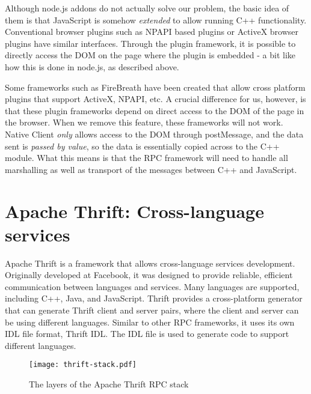 Although node.js addons do not actually solve our problem, the basic idea of them is that JavaScript is somehow \emph{extended} to allow running C++ functionality. Conventional browser plugins such as NPAPI based plugins or ActiveX browser plugins have similar interfaces. Through the plugin framework, it is possible to directly access the DOM on the page where the plugin is embedded - a bit like how this is done in node.js, as described above. 

Some frameworks such as FireBreath\cite{firebreath} have been created that allow cross platform plugins that support ActiveX, NPAPI, etc. A crucial difference for us, however, is that these plugin frameworks depend on direct access to the DOM of the page in the browser. When we remove this feature, these frameworks will not work. Native Client \emph{only} allows access to the DOM through postMessage, and the data sent is \emph{passed by value}, so the data is essentially copied across to the C++ module. What this means is that the RPC framework will need to handle all marshalling as well as transport of the messages between C++ and JavaScript.




\section{Apache Thrift: Cross-language services} %
\label{sec:apache_thrift_cross_language_services}
Apache Thrift is a framework that allows cross-language services development. Originally developed at Facebook, it was designed to provide reliable, efficient communication between languages and services. Many languages are supported, including C++, Java, and JavaScript. Thrift provides a cross-platform generator that can generate Thrift client and server pairs, where the client and server can be using different languages. Similar to other RPC frameworks, it uses its own IDL file format, Thrift IDL. The IDL file is used to generate code to support different languages.

\begin{figure}
    \centering
    \texttt{[image: thrift-stack.pdf]} 
    \caption{The layers of the Apache Thrift RPC stack}
    \label{fig:thrift-stack}
\end{figure}

